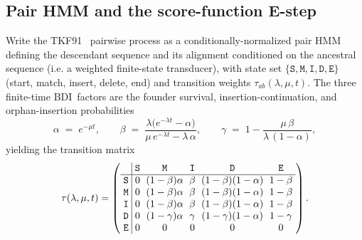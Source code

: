 \documentclass{article}
\newcommand{\BDI}{\textsc{BDI}}
\newcommand{\ins}{\lambda}
\newcommand{\del}{\mu}
\newcommand{\ext}{r}
\newcommand{\hst}[1]{\texttt{#1}}
\begin{document}
\subsection{Pair HMM and the score-function E-step}

Write the TKF91~\cite{ThorneEtAl91} pairwise process as a conditionally-normalized pair HMM defining the 
descendant sequence and its alignment conditioned on the ancestral sequence 
(i.e. a weighted finite-state transducer), with state set
$\{\hst{S},\hst{M},\hst{I},\hst{D},\hst{E}\}$ (start, match, insert,
delete, end) and transition weights $\tau_{ab}(\ins,\del,t)$. 
The three finite-time \BDI\ factors are the founder survival, insertion-continuation, and orphan-insertion probabilities~\cite{Kendall1948,Feller1939,KarlinMcGregor1957} 
\begin{equation}
\label{eq:abg}
\alpha \;=\; e^{-\del t}, \qquad
\beta \;=\; \frac{\ins\bigl(e^{-\ins t}-\alpha\bigr)}
                 {\del\,e^{-\ins t}-\ins\,\alpha}, \qquad
\gamma \;=\; 1-\frac{\del\,\beta}{\ins\,(1-\alpha)},
\end{equation}
yielding the transition 
matrix
\begin{equation}
\label{eq:cond_tkf91}
\tau(\ins,\del,t) =
\left(
    \setlength{\arraycolsep}{3pt}
    \begin{array}{r|ccccc}
    & \hst{S} & \hst{M} & \hst{I} & \hst{D} & \hst{E} \\
    \hline
    \hst{S} & 0 & (1-\beta)\alpha & \beta & (1-\beta)(1-\alpha) & 1-\beta \\
    \hst{M} & 0 & (1-\beta)\alpha & \beta & (1-\beta)(1-\alpha) & 1-\beta \\
    \hst{I} & 0 & (1-\beta)\alpha & \beta & (1-\beta)(1-\alpha) & 1-\beta \\
    \hst{D} & 0 & (1-\gamma)\alpha & \gamma & (1-\gamma)(1-\alpha) & 1-\gamma \\
    \hst{E} & 0 & 0 & 0 & 0 & 0
    \end{array}
\right).
\end{equation}
\end{document}
